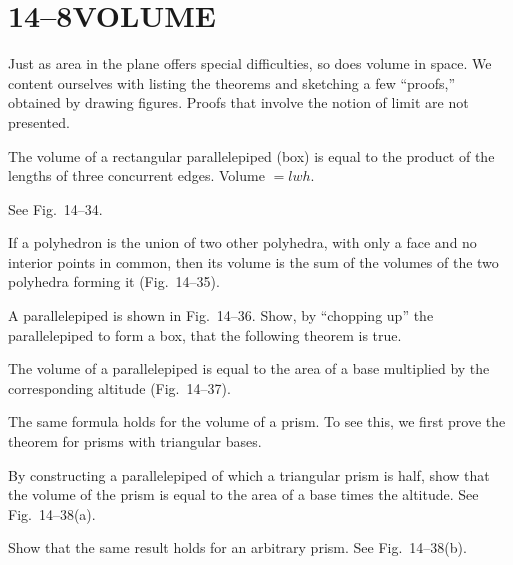 \documentclass[11pt]{book}
\begin{document}
\section*{14--8\quad VOLUME}

Just as area in the plane offers special difficulties, so does volume in space.
We content ourselves with listing the theorems and sketching a few ``proofs,''
obtained by drawing figures. Proofs that involve the notion of limit are not
presented.

\begin{theorem}
The volume of a rectangular parallelepiped (box) is equal to the product of the
lengths of three concurrent edges. Volume $=lwh$.
\end{theorem}

\noindent See Fig.~14--34.

\FIGXIVTHIRTYFOURTHIRTYFIVE

\begin{theorem}
If a polyhedron is the union of two other polyhedra, with only a face and no
interior points in common, then its volume is the sum of the volumes of the two
polyhedra forming it (Fig.~14--35).
\end{theorem}

A parallelepiped is shown in Fig.~14--36. Show, by ``chopping up'' the
parallelepiped to form a box, that the following theorem is true.

\FIGXIVTHIRTYSIXTHIRTYSEVEN

\begin{theorem}
The volume of a parallelepiped is equal to the area of a base multiplied by the
corresponding altitude (Fig.~14--37).
\end{theorem}

The same formula holds for the volume of a prism. To see this, we first prove
the theorem for prisms with triangular bases.

\begin{exercisecols}
\begin{exlist}
\item By constructing a parallelepiped of which a triangular prism is half, show
      that the volume of the prism is equal to the area of a base times the
      altitude. See Fig.~14--38(a).
\exfig{\FIGXIVTHIRTYEIGHT}
\item Show that the same result holds for an arbitrary prism. See
      Fig.~14--38(b).
\end{exlist}
\end{exercisecols}
\end{document}
